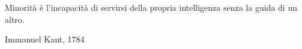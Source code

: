 \begin{titlepage}
	\thispagestyle{empty}
	\topmargin=6.5cm
	\raggedleft
	\large
	\em
  \epigraph{
    Minorità è l'incapacità di servirsi della propria intelligenza senza la guida di un altro.}
  {Immanuel Kant, 1784}
	\newpage
	\clearpage{\pagestyle{empty}\cleardoublepage}
\end{titlepage}

